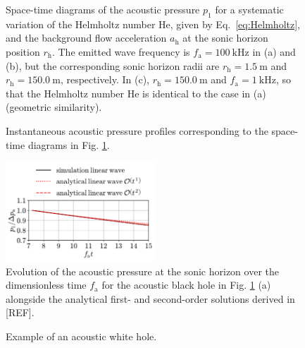 \begin{figure}
    \caption{Space-time diagrams of the acoustic pressure $p_1$ for a systematic variation of the Helmholtz number $\mathrm{He}$, given by Eq.~\eqref{eq:Helmholtz}, and the background flow acceleration $a_{\mathrm{h}}$ at the sonic horizon position $r_{\mathrm{h}}$. The emitted wave frequency is $f_{\mathrm{a}}=100\mathrm{\:kHz}$ in (a) and (b), but the corresponding sonic horizon radii are $r_{\mathrm{h}}=1.5\mathrm{\:m}$ and $r_{\mathrm{h}}=150.0\mathrm{\:m}$, respectively. In (c), $r_{\mathrm{h}}=150.0\mathrm{\:m}$ and $f_{\mathrm{a}}=1\mathrm{\:kHz}$, so that the Helmholtz number $\mathrm{He}$ is identical to the case in (a) (geometric similarity).}
    \label{fig:rt}
\end{figure}


\begin{figure}
    \caption{Instantaneous acoustic pressure profiles corresponding to the space-time diagrams in Fig. \ref{fig:rt}.}
    \label{fig:pr}
\end{figure}

\begin{figure}
    \centering
    \includegraphics[width=0.5\textwidth]{figures/horizon_smallABH.pdf}
    \caption{Evolution of the acoustic pressure at the sonic horizon over the dimensionless time $f_{\mathrm{a}}$ for the acoustic black hole in Fig. \ref{fig:rt} (a) alongside the analytical first- and second-order solutions derived in [REF].}
    \label{fig:horizon_smallABH}
\end{figure}


\begin{figure}
    \caption{Example of an acoustic white hole.}
    \label{fig:WH}
\end{figure}



